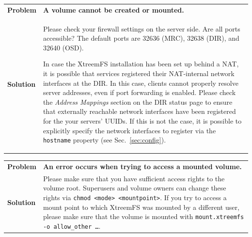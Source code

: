 \documentclass[a4paper,10pt]{book}
\begin{document}
\begin{tabular}{lp{10cm}}
 \textbf{Problem}  & \textbf{A volume cannot be created or mounted.} \\
 \textbf{Solution} & Please check your firewall settings on the server side. Are all ports accessible? The default ports are 32636 (MRC), 32638 (DIR), and 32640 (OSD).

 In case the XtreemFS installation has been set up behind a NAT, it is possible that services registered their NAT-internal network interfaces at the DIR. In this case, clients cannot properly resolve server addresses, even if port forwarding is enabled. Please check the \emph{Address Mappings} section on the DIR status page to ensure that externally reachable network interfaces have been registered for the your servers' UUIDs. If this is not the case, it is possible to explicitly specify the network interfaces to register via the \texttt{hostname} property (see Sec.\ \ref{sec:config}).
\end{tabular}

\begin{tabular}{lp{10cm}}
 \textbf{Problem}  & \textbf{An error occurs when trying to access a mounted volume.} \\
 \textbf{Solution} & Please make sure that you have sufficient access rights to the volume root. Superusers and volume owners can change these rights via \texttt{chmod <mode> <mountpoint>}. If you try to access a mount point to which XtreemFS was mounted by a different user, please make sure that the volume is mounted with \texttt{mount.xtreemfs -o allow\_other \dots}.
\end{tabular}
\end{document}
